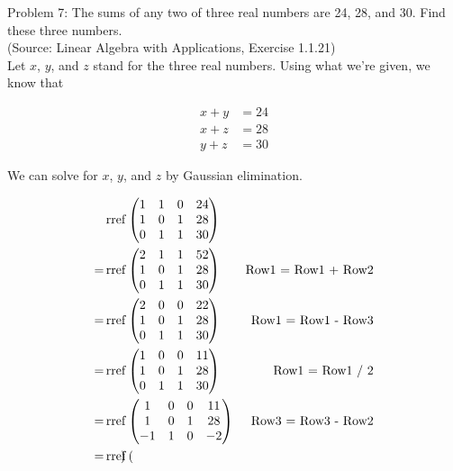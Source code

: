 \documentclass{article}
\begin{document}
Problem 7: The sums of any two of three real numbers are 24, 28, and 30. Find these three numbers. \\

(Source: Linear Algebra with Applications, Exercise 1.1.21) \\

Let $x$, $y$, and $z$ stand for the three real numbers. Using what we're given, we know that

\begin{align*}
x + y &= 24 \\
x + z &= 28 \\
y + z &= 30
\end{align*}

We can solve for $x$, $y$, and $z$ by Gaussian elimination.

\begin{align*}
& \mathop{\rm rref} \begin{pmatrix}
1 & 1 & 0 & 24 \\
1 & 0 & 1 & 28 \\
0 & 1 & 1 & 30
\end{pmatrix} \\
= & \mathop{\rm rref} \begin{pmatrix}
2 & 1 & 1 & 52 \\
1 & 0 & 1 & 28 \\
0 & 1 & 1 & 30
\end{pmatrix} & \text{Row1 = Row1 + Row2} \\
= & \mathop{\rm rref} \begin{pmatrix}
2 & 0 & 0 & 22 \\
1 & 0 & 1 & 28 \\
0 & 1 & 1 & 30
\end{pmatrix} & \text{Row1 = Row1 - Row3} \\
= & \mathop{\rm rref} \begin{pmatrix}
1 & 0 & 0 & 11 \\
1 & 0 & 1 & 28 \\
0 & 1 & 1 & 30
\end{pmatrix} & \text{Row1 = Row1 / 2} \\
= & \mathop{\rm rref} \begin{pmatrix}
1 & 0 & 0 & 11 \\
1 & 0 & 1 & 28 \\
-1 & 1 & 0 & -2
\end{pmatrix} & \text{Row3 = Row3 - Row2} \\
= & \mathop{\rm rref} \begin{pmatrix}

\end{pmatrix}
\end{align*}
\end{document}
